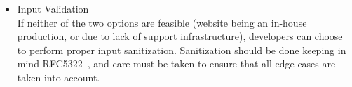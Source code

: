 \begin{itemize}
	\item Input Validation\\
	If neither of the two options are feasible (website being an in-house production, or due to lack of support infrastructure), developers can choose to perform proper input sanitization. Sanitization should be done keeping in mind RFC5322~\cite{rfc5322}, and care must be taken to ensure that all edge cases are taken into account.
	
\end{itemize}
